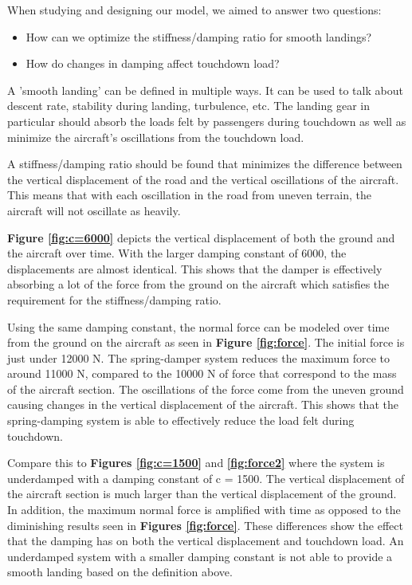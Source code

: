 \documentclass[12pt,letterpaper, onecolumn]{exam}
\begin{document}
\begin{questions}
        \begin{solution}
        
            When studying and designing our model, we aimed to answer two questions: 
            \begin{itemize}
                \item How can we optimize the stiffness/damping ratio for smooth landings?
                \item How do changes in damping affect touchdown load?
            \end{itemize}

            A 'smooth landing' can be defined in multiple ways. It can be used to talk about descent rate, stability during landing, turbulence, etc. The landing gear in particular should absorb the loads felt by passengers during touchdown as well as minimize the aircraft's oscillations from the touchdown load. 

            A stiffness/damping ratio should be found that minimizes the difference between the vertical displacement of the road and the vertical oscillations of the aircraft. This means that with each oscillation in the road from uneven terrain, the aircraft will not oscillate as heavily. 

            \textbf{Figure \ref{fig:c=6000}} depicts the vertical displacement of both the ground and the aircraft over time. With the larger damping constant of 6000, the displacements are almost identical. This shows that the damper is effectively absorbing a lot of the force from the ground on the aircraft which satisfies the requirement for the stiffness/damping ratio. 

            Using the same damping constant, the normal force can be modeled over time from the ground on the aircraft as seen in \textbf{Figure \ref{fig:force}}. The initial force is just under 12000 N. The spring-damper system reduces the maximum force to around 11000 N, compared to the 10000 N of force that correspond to the mass of the aircraft section. The oscillations of the force come from the uneven ground causing changes in the vertical displacement of the aircraft. This shows that the spring-damping system is able to effectively reduce the load felt during touchdown. 

            Compare this to \textbf{Figures \ref{fig:c=1500}} and \textbf{\ref{fig:force2}} where the system is underdamped with a damping constant of c = 1500. The vertical displacement of the aircraft section is much larger than the vertical displacement of the ground. In addition, the maximum normal force is amplified with time as opposed to the diminishing results seen in \textbf{Figures \ref{fig:force}}. These differences show the effect that the damping has on both the vertical displacement and touchdown load. An underdamped system with a smaller damping constant is not able to provide a smooth landing based on the definition above.\\\
            

\end{solution}
\end{questions}
\end{document}
